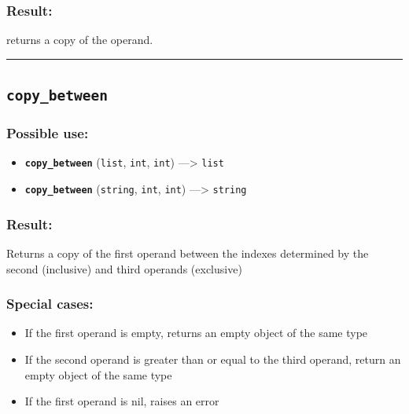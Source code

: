 \documentclass[]{book}
\providecommand{\tightlist}{%
  \setlength{\itemsep}{0pt}\setlength{\parskip}{0pt}}
\theoremstyle{definition}
\theoremstyle{definition}
\theoremstyle{definition}
\theoremstyle{remark}
\begin{document}
\subsubsection{Result:}\label{result-103}

returns a copy of the operand.

\begin{center}\rule{0.5\linewidth}{\linethickness}\end{center}

\subsection{\texorpdfstring{\texttt{copy\_between}}{copy\_between}}\label{copy_between}

\subsubsection{Possible use:}\label{possible-use-107}

\begin{itemize}
\tightlist
\item
  \textbf{\texttt{copy\_between}} (\texttt{list}, \texttt{int},
  \texttt{int}) ---\textgreater{} \texttt{list}
\item
  \textbf{\texttt{copy\_between}} (\texttt{string}, \texttt{int},
  \texttt{int}) ---\textgreater{} \texttt{string}
\end{itemize}

\subsubsection{Result:}\label{result-104}

Returns a copy of the first operand between the indexes determined by
the second (inclusive) and third operands (exclusive)

\subsubsection{Special cases:}\label{special-cases-37}

\begin{itemize}
\tightlist
\item
  If the first operand is empty, returns an empty object of the same
  type\\
\item
  If the second operand is greater than or equal to the third operand,
  return an empty object of the same type\\
\item
  If the first operand is nil, raises an error
\end{itemize}
\end{document}
